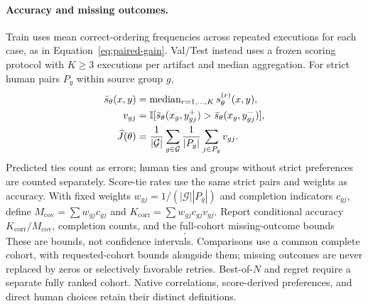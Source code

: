 \paragraph{Accuracy and missing outcomes.}
Train uses mean correct-ordering frequencies across repeated executions for each case, as in Equation~\ref{eq:paired-gain}.
Val/Test instead uses a frozen scoring protocol with $K\geq3$ executions per artifact and median aggregation.
For strict human pairs $P_g$ within source group $g$,
\begin{equation}
 \begin{aligned}
 \bar s_\theta(x,y)&=\operatorname{median}_{r=1,\ldots,K}s_\theta^{(r)}(x,y),\\
 v_{gj}&=\mathbb{I}[\bar s_\theta(x_g,y_{gj}^{+})>\bar s_\theta(x_g,y_{gj}^{-})],\\
 \widehat J(\theta)&=\frac{1}{|\mathcal G|}\sum_{g\in\mathcal G}
       \frac{1}{|P_g|}\sum_{j\in P_g}v_{gj}.
 \end{aligned}
 \label{eq:measurement}
\end{equation}
Predicted ties count as errors; human ties and groups without strict preferences are counted separately.
Score-tie rates use the same strict pairs and weights as accuracy.
With fixed weights $w_{gj}=1/(|\mathcal G||P_g|)$ and completion indicators $c_{gj}$, define
$M_{\mathrm{cov}}=\sum w_{gj}c_{gj}$ and $K_{\mathrm{corr}}=\sum w_{gj}c_{gj}v_{gj}$.
Report conditional accuracy $K_{\mathrm{corr}}/M_{\mathrm{cov}}$, completion counts, and the full-cohort missing-outcome bounds
\begin{equation}
 [K_{\mathrm{corr}},\,K_{\mathrm{corr}}+1-M_{\mathrm{cov}}].
 \label{eq:missing}
\end{equation}
These are bounds, not confidence intervals.
Comparisons use a common complete cohort, with requested-cohort bounds alongside them; missing outcomes are never replaced by zeros or selectively favorable retries.
Best-of-$N$ and regret require a separate fully ranked cohort.
Native correlations, score-derived preferences, and direct human choices retain their distinct definitions.


